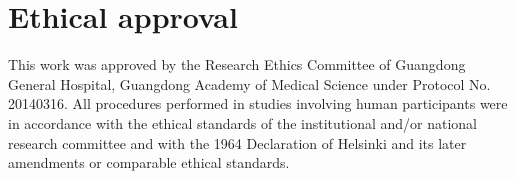 \documentclass{article}
\begin{document}
\section*{Ethical approval}
This work was approved by the Research Ethics Committee of Guangdong General Hospital, Guangdong Academy of Medical Science under Protocol No. 20140316.
All procedures performed in studies involving human participants were in accordance with the ethical standards of the institutional and/or national research committee and with the 1964 Declaration of Helsinki and its later amendments or comparable ethical standards.



\end{document}
